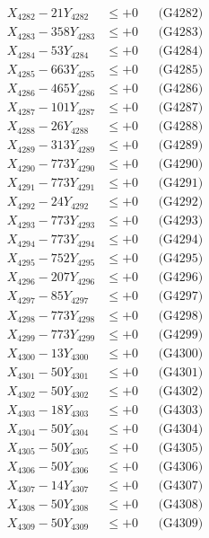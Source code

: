 \documentclass[a4paper,10pt]{article}
\begin{document}
{\begin{align}
X_{4282} - 21Y_{4282} &\leq +0 && \text{(G4282)} \\
X_{4283} - 358Y_{4283} &\leq +0 && \text{(G4283)} \\
X_{4284} - 53Y_{4284} &\leq +0 && \text{(G4284)} \\
X_{4285} - 663Y_{4285} &\leq +0 && \text{(G4285)} \\
X_{4286} - 465Y_{4286} &\leq +0 && \text{(G4286)} \\
X_{4287} - 101Y_{4287} &\leq +0 && \text{(G4287)} \\
X_{4288} - 26Y_{4288} &\leq +0 && \text{(G4288)} \\
X_{4289} - 313Y_{4289} &\leq +0 && \text{(G4289)} \\
X_{4290} - 773Y_{4290} &\leq +0 && \text{(G4290)} \\
\allowbreak
X_{4291} - 773Y_{4291} &\leq +0 && \text{(G4291)} \\
X_{4292} - 24Y_{4292} &\leq +0 && \text{(G4292)} \\
X_{4293} - 773Y_{4293} &\leq +0 && \text{(G4293)} \\
X_{4294} - 773Y_{4294} &\leq +0 && \text{(G4294)} \\
X_{4295} - 752Y_{4295} &\leq +0 && \text{(G4295)} \\
X_{4296} - 207Y_{4296} &\leq +0 && \text{(G4296)} \\
X_{4297} - 85Y_{4297} &\leq +0 && \text{(G4297)} \\
X_{4298} - 773Y_{4298} &\leq +0 && \text{(G4298)} \\
X_{4299} - 773Y_{4299} &\leq +0 && \text{(G4299)} \\
X_{4300} - 13Y_{4300} &\leq +0 && \text{(G4300)} \\
\allowbreak
X_{4301} - 50Y_{4301} &\leq +0 && \text{(G4301)} \\
X_{4302} - 50Y_{4302} &\leq +0 && \text{(G4302)} \\
X_{4303} - 18Y_{4303} &\leq +0 && \text{(G4303)} \\
X_{4304} - 50Y_{4304} &\leq +0 && \text{(G4304)} \\
X_{4305} - 50Y_{4305} &\leq +0 && \text{(G4305)} \\
X_{4306} - 50Y_{4306} &\leq +0 && \text{(G4306)} \\
X_{4307} - 14Y_{4307} &\leq +0 && \text{(G4307)} \\
X_{4308} - 50Y_{4308} &\leq +0 && \text{(G4308)} \\
X_{4309} - 50Y_{4309} &\leq +0 && \text{(G4309)} \\

\end{align}}
\end{document}
